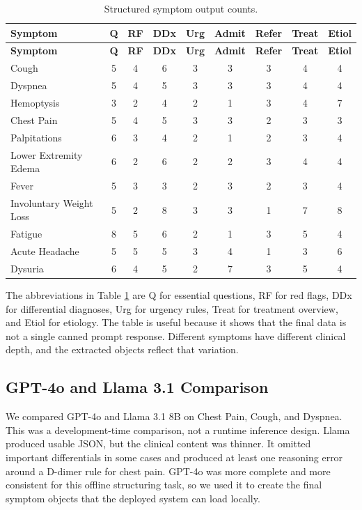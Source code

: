 \begin{longtable}{p{} c c c c c c c c}
\caption{Structured symptom output counts.}
\label{tab:symptom_counts}\\
\toprule
\textbf{Symptom} & \textbf{Q} & \textbf{RF} & \textbf{DDx} & \textbf{Urg} & \textbf{Admit} & \textbf{Refer} & \textbf{Treat} & \textbf{Etiol}\\
\midrule
\endfirsthead
\toprule
\textbf{Symptom} & \textbf{Q} & \textbf{RF} & \textbf{DDx} & \textbf{Urg} & \textbf{Admit} & \textbf{Refer} & \textbf{Treat} & \textbf{Etiol}\\
\midrule
\endhead
Cough & 5 & 4 & 6 & 3 & 3 & 3 & 4 & 4\\
Dyspnea & 5 & 4 & 5 & 3 & 3 & 3 & 4 & 4\\
Hemoptysis & 3 & 2 & 4 & 2 & 1 & 3 & 4 & 7\\
Chest Pain & 5 & 4 & 5 & 3 & 3 & 2 & 3 & 3\\
Palpitations & 6 & 3 & 4 & 2 & 1 & 2 & 3 & 4\\
Lower Extremity Edema & 6 & 2 & 6 & 2 & 2 & 3 & 4 & 4\\
Fever & 5 & 3 & 3 & 2 & 3 & 2 & 3 & 4\\
Involuntary Weight Loss & 5 & 2 & 8 & 3 & 3 & 1 & 7 & 8\\
Fatigue & 8 & 5 & 6 & 2 & 1 & 3 & 5 & 4\\
Acute Headache & 5 & 5 & 5 & 3 & 4 & 1 & 3 & 6\\
Dysuria & 6 & 4 & 5 & 2 & 7 & 3 & 5 & 4\\
\bottomrule
\end{longtable}

The abbreviations in Table \ref{tab:symptom_counts} are Q for essential questions, RF for red flags, DDx for differential diagnoses, Urg for urgency rules, Treat for treatment overview, and Etiol for etiology. The table is useful because it shows that the final data is not a single canned prompt response. Different symptoms have different clinical depth, and the extracted objects reflect that variation.

\subsection{GPT-4o and Llama 3.1 Comparison}

We compared GPT-4o and Llama 3.1 8B on Chest Pain, Cough, and Dyspnea. This was a development-time comparison, not a runtime inference design. Llama produced usable JSON, but the clinical content was thinner. It omitted important differentials in some cases and produced at least one reasoning error around a D-dimer rule for chest pain. GPT-4o was more complete and more consistent for this offline structuring task, so we used it to create the final symptom objects that the deployed system can load locally.

